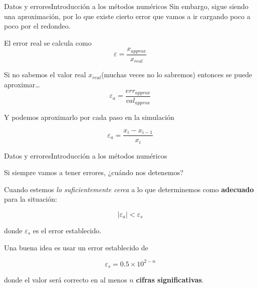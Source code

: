 \documentclass[spanish, c]{beamer}
\begin{document}
\begin{frame}{Datos y errores}{Introducción a los métodos numéricos}
    Sin embargo, sigue siendo una aproximación, por lo que existe cierto \alert{error} que vamos a ir cargando poco a poco por el redondeo. \pause

    \bigskip

    El \alert{error real} se calcula como
    $$\varepsilon = \frac{x_{approx}}{x_{real}}$$ \pause

    Si no sabemos el valor real $x_{real}$(muchas veces no lo sabremos) entonces se puede aproximar\dots \pause
    $$\varepsilon_a = \frac{err_{approx}}{val_{approx}}$$ \pause

    Y podemos aproximarlo por cada paso en la simulación

    $$\varepsilon_a = \frac{x_i - x_{i-1}}{x_i}$$

\end{frame}

\begin{frame}{Datos y errores}{Introducción a los métodos numéricos}

    Si siempre vamos a tener errores, ¿cuándo nos detenemos? \pause

    Cuando estemos \textit{lo suficientemente cerca} a lo que determinemos como \textbf{adecuado} para la situación:

    $$\mid \varepsilon_a \mid < \varepsilon_s$$

    donde $\varepsilon_s$ es el \alert{error establecido}. \pause

    Una buena idea es usar un error establecido de
    
    $$\varepsilon_s = 0.5 \times 10^{2-n}$$

    donde el valor será correcto en al menos $n$ \textbf{cifras significativas}.
    
\end{frame}




\end{document}
